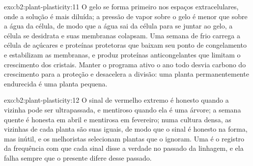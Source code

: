 \begin{solution}{exo:b2:plant-plasticity:11}
O gelo se forma primeiro nos espaços extracelulares, onde a solução é
mais diluída; a pressão de vapor sobre o gelo é menor que sobre a água
da célula, de modo que a água sai da célula para se juntar ao gelo, a
célula se desidrata e suas membranas colapsam. Uma semana de frio
carrega a célula de açúcares e proteínas protetoras que baixam seu
ponto de congelamento e estabilizam as membranas, e produz proteínas
anticongelantes que limitam o crescimento dos cristais. Manter o
programa ativo o ano todo desvia carbono do crescimento para a proteção
e desacelera a divisão: uma planta permanentemente endurecida é uma
planta pequena.
\end{solution}

\begin{solution}{exo:b2:plant-plasticity:12}
O sinal de vermelho extremo é honesto quando a vizinha pode ser
ultrapassada, e mentiroso quando ela é uma árvore; a semana quente é
honesta em abril e mentirosa em fevereiro; numa cultura densa, as
vizinhas de cada planta são suas iguais, de modo que o sinal é honesto
na forma, mas inútil, e os melhoristas selecionam plantas que o
ignoram. Uma  é o registro da frequência com que cada
sinal disse a verdade no passado da linhagem, e ela falha sempre que o
presente difere desse passado.
\end{solution}

